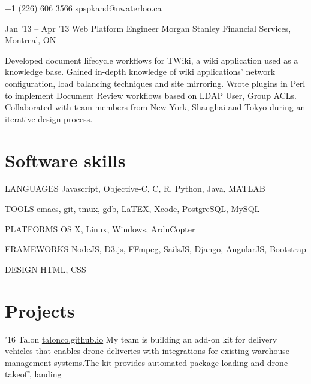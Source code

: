 \documentclass{tccv}
\begin{document}
\begin{eventlist}
{+1 (226) 606 3566}
{spspkand@uwaterloo.ca}
\vspace{0.4cm}

\item{Jan '13 -- Apr '13}
  {Web Platform Engineer}
  {Morgan Stanley Financial Services, Montreal, ON}

  Developed document lifecycle workflows for TWiki, a wiki application used as a
  knowledge base. Gained in-depth knowledge of wiki applications' network
  configuration, load balancing techniques and site mirroring. Wrote plugins in
  Perl to implement Document Review workflows based on LDAP User, Group ACLs.
  Collaborated with team members from New York, Shanghai and Tokyo during an
  iterative design process.

\end{eventlist}


\section{Software skills}

\begin{factlist}
\item{LANGUAGES}
  {Javascript, Objective-C, C, R, Python, Java, MATLAB}

\item{TOOLS}
  {emacs, git, tmux, gdb, LaTEX, Xcode, PostgreSQL, MySQL}

\item{PLATFORMS}
  {OS X, Linux, Windows, ArduCopter}

\item{FRAMEWORKS}
  {NodeJS, D3.js, FFmpeg, SailsJS, Django, AngularJS, Bootstrap}

\item{DESIGN}
  {HTML, CSS}


\end{factlist}

\section{Projects}

\begin{yearlist}

\item{'16}
  {Talon \href{http://talonco.github.io}{talonco.github.io}}
  {My team is building an add-on kit for delivery vehicles that enables drone deliveries with integrations for existing warehouse management systems.The kit provides automated package loading and drone takeoff, landing}

\end{yearlist}
\end{document}
